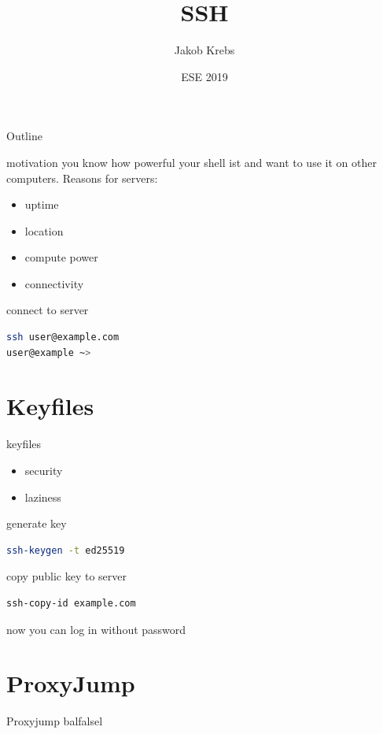 \documentclass[10pt,graphics,aspectratio=169,table]{beamer}
\title{SSH}
\author{Jakob Krebs}
\date{ESE 2019}
\institute{NERD101 - ESE - ifsr - TU Dresden}
\begin{document}
\maketitle
\begin{frame}{Outline}
    \tableofcontents
\end{frame}

\begin{frame}{motivation}
you know how powerful your shell ist and want to use it on other computers.
Reasons for servers:
    \begin{itemize}
        \item uptime
        \item location
        \item compute power
        \item connectivity
    \end{itemize}
\end{frame}
\begin{frame}[fragile]{connect to server}
    \begin{lstlisting}[language=bash]
 ssh user@example.com
user@example ~>
    \end{lstlisting}
\end{frame}
\section{Keyfiles}
\begin{frame}[fragile]{keyfiles}
    \begin{itemize}
        \item security
        \item laziness
    \end{itemize}
    generate key
    \begin{lstlisting}[language=bash]
 ssh-keygen -t ed25519
    \end{lstlisting}
    copy public key to server
    \begin{lstlisting}[language=bash]
 ssh-copy-id example.com
    \end{lstlisting}
    now you can log in without password
\end{frame}
\section{ProxyJump}
\begin{frame}[fragile]{Proxyjump}
    balfalsel
\end{frame}
\end{document}

